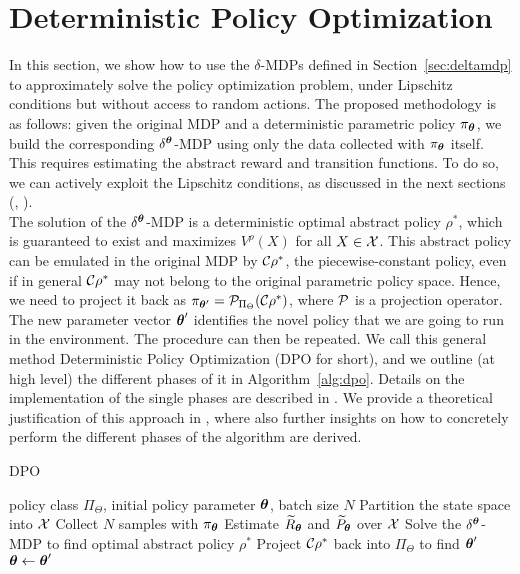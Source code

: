 \section{Deterministic Policy Optimization}\label{sec:algo}
In this section, we show how to use the $\delta$-MDPs defined in Section~\ref{sec:deltamdp} to approximately solve the policy optimization problem, under Lipschitz conditions but without access to random actions.
%
The proposed methodology is as follows: given the original \ac{MDP} and a deterministic parametric policy $\pi_{\boldsymbol{\theta}}$, we build the corresponding  $\delta^{\boldsymbol{\theta}}$-\ac{MDP} using only the data collected with $\pi_{\boldsymbol{\theta}}$ itself. This requires estimating the abstract reward and transition functions. To do so, we can actively exploit the Lipschitz conditions, as discussed in the next sections (, ).\\
\newline
The solution of the $\delta^{\boldsymbol{\theta}}$-\ac{MDP} is a deterministic optimal abstract policy $\rho^{*}$, which is guaranteed to exist and maximizes $V^{\rho}(X)$ for all $X\in\mathcal{X}$. This abstract policy can be emulated in the original \ac{MDP} by $\mathcal{C}\rho^{*}$, the piecewise-constant policy, even if in general $\mathcal{C}\rho^{*}$ may not belong to the original parametric policy space. Hence, we need to project it back as $\pi_{\boldsymbol{\theta}'} = \mathcal{P}_{\Pi_{\Theta}}(\mathcal{C}\rho^{*})$, where $\mathcal{P}$ is a projection operator. The new parameter vector $\boldsymbol{\theta}'$ identifies the novel policy that we are going to run in the environment. The procedure can then be repeated. We call this general method Deterministic Policy Optimization (\ac{DPO} for short), and we outline (at high level) the different phases of it in Algorithm~\ref{alg:dpo}. Details on the implementation of the single phases are described in .
We provide a theoretical justification of this approach in , where also further insights on how to concretely perform the different phases of the algorithm are derived.
%
%
\begin{algorithm}[t]
	\caption{DPO}
	\label{alg:dpo}
	\begin{algorithmic}[1]
		 policy class $\Pi_{\Theta}$, initial policy parameter $\boldsymbol{\theta}$, batch size $N$
		\STATE Partition the state space into $\mathcal{X}$
		\STATE Collect $N$ samples with $\pi_{\boldsymbol{\theta}}$ 
		\STATE Estimate $\widetilde{R}_{\boldsymbol{\theta}}$ and $\widetilde{P}_{\boldsymbol{\theta}}$ over $\mathcal{X}$
		\STATE Solve the $\delta^{\boldsymbol{\theta}}$-MDP to find optimal abstract policy $\rho^{*}$
		\STATE Project $\mathcal{C}\rho^{*}$ back into $\Pi_{\Theta}$ to find $\boldsymbol{\theta}'$
		\STATE $\boldsymbol{\theta}\gets\boldsymbol{\theta}'$
		\ENDFOR
	\end{algorithmic}
\end{algorithm}
%

